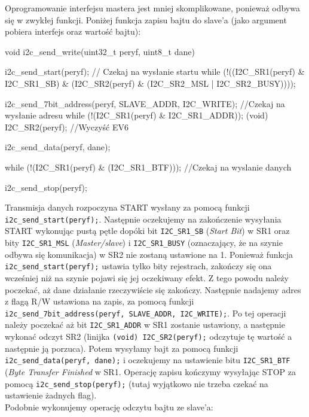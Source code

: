 \documentclass{pdfBooklets}
\begin{document}
Oprogramowanie interfejsu mastera jest mniej skomplikowane, ponieważ odbywa się w zwykłej funkcji. Poniżej funkcja zapisu bajtu do slave'a (jako
argument pobiera interfejs oraz wartość bajtu):

\begin{CodeFrame*}[c]{}
void i2c_send_write(uint32_t peryf, uint8_t dane){
  i2c_send_start(peryf);
  // Czekaj na wysłanie startu
  while (!((I2C_SR1(peryf) & I2C_SR1_SB)
	   & (I2C_SR2(peryf) & (I2C_SR2_MSL | I2C_SR2_BUSY))));
  
  i2c_send_7bit_address(peryf, SLAVE_ADDR, I2C_WRITE);
  //Czekaj na wysłanie adresu
  while (!(I2C_SR1(peryf) & I2C_SR1_ADDR));
  (void) I2C_SR2(peryf); //Wyczyść EV6

  
  i2c_send_data(peryf, dane);

  while (!(I2C_SR1(peryf) & (I2C_SR1_BTF))); //Czekaj na wyslanie danych

  i2c_send_stop(peryf);
}
\end{CodeFrame*}

Transmisja danych rozpoczyna START wysłany za pomocą funkcji \Verb$i2c_send_start(peryf);$. Następnie oczekujemy na zakończenie wysyłania START
wykonując pustą pętle dopóki bit \Verb$I2C_SR1_SB$ (\textit{Start Bit}) w SR1 oraz bity \Verb$I2C_SR1_MSL$ (\textit{Master/slave}) i
\Verb$I2C_SR1_BUSY$ (oznaczający, że na szynie odbywa się komunikacja) w SR2 nie zostaną ustawione na 1. Ponieważ funkcja \Verb$i2c_send_start(peryf);$
ustawia tylko bity rejestrach, zakończy się ona wcześniej niż na szynie pojawi się jej oczekiwany efekt. Z tego powodu należy poczekać, aż dane
działanie rzeczywiście się zakończy. Następnie nadajemy adres z flagą R/W ustawiona na zapis, za pomocą funkcji
\Verb$i2c_send_7bit_address(peryf, SLAVE_ADDR, I2C_WRITE);$. Po tej operacji należy poczekać aż bit \Verb$I2C_SR1_ADDR$ w SR1 zostanie ustawiony, a
następnie wykonać odczyt SR2 (linijka \Verb$(void) I2C_SR2(peryf);$ odczytuje tę wartość a następnie ją porzuca). Potem wysyłamy bajt za pomocą
funkcji \Verb$i2c_send_data(peryf, dane);$ i oczekujemy na ustawienie bitu \Verb$I2C_SR1_BTF$ (\textit{Byte Transfer Finished} w SR1.
Operację zapisu kończymy wysyłając STOP za pomocą \Verb$i2c_send_stop(peryf);$ (tutaj wyjątkowo nie trzeba czekać na ustawienie żadnych flag).\\

Podobnie wykonujemy operację odczytu bajtu ze slave'a:
\end{document}
